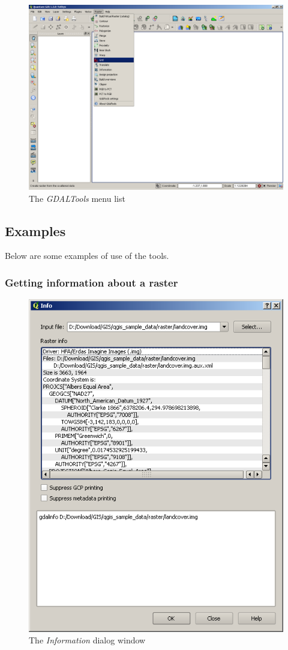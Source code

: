 \begin{figure}[ht]
   \centering
   \caption{\label{gdaltools_menu}The \emph{GDALTools} menu list \nixcaption}
   \includegraphics[clip=true, width=12cm]{plugins_gdaltools_images/raster_menu}
\end{figure}

\subsection{Examples}\label{gdal_examples}
Below are some examples of use of the tools.
\subsubsection{Getting information about a raster}
\begin{figure}[ht]
   \centering
   \caption{\label{gdalinfo}The \emph{Information} dialog window \nixcaption}
   \includegraphics[clip=true, width=12cm]{plugins_gdaltools_images/gdalinfo}
\end{figure}

